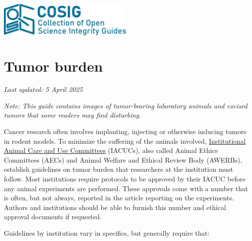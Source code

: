\documentclass[letterpaper, 12pt]{article}
\begin{document}
\flushleft
\includegraphics[width=0.5\textwidth]{img/home/241017_final_logo_mockup.png}

\section*{Tumor burden}
\textit{Last updated: 5 April 2025}

\textit{Note: This guide contains images of tumor-bearing laboratory animals and excised tumors that some readers may find disturbing.}

Cancer research often involves implanting, injecting or otherwise inducing tumors in rodent models. To minimize the suffering of the animals involved, \href{https://en.wikipedia.org/wiki/Institutional_Animal_Care_and_Use_Committee}{Institutional Animal Care and Use Committees} (IACUCs), also called Animal Ethics Committees (AECs) and Animal Welfare and Ethical Review Body (AWERBs), establish guidelines on tumor burden that researchers at the institution must follow. Most institutions require protocols to be approved by their IACUC before any animal experiments are performed. These approvals come with a number that is often, but not always, reported in the article reporting on the experiments. Authors and institutions should be able to furnish this number and ethical approval documents if requested.

Guidelines by institution vary in specifics, but generally require that:
\end{document}
